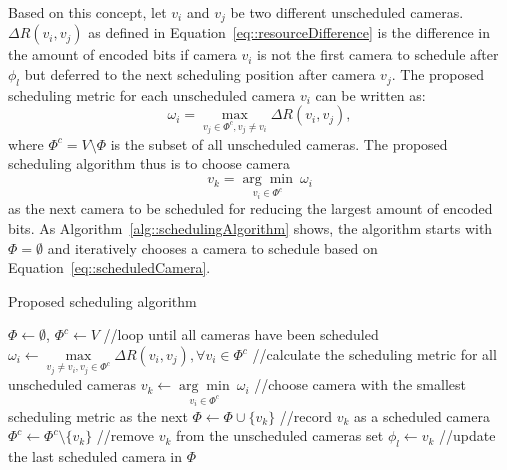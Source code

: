 Based on this concept, let $v_i$ and $v_j$ be two different unscheduled cameras.
$\Delta R(v_i,v_j)$ as defined in Equation~\eqref{eq::resourceDifference} is the
difference in the amount of encoded bits if camera $v_i$ is not the first camera
to schedule after $\phi_l$
but deferred to the next scheduling position after camera $v_j$.
%
The proposed scheduling metric for each unscheduled camera $v_i$ can be written as:
\begin{equation}
\omega_i = \max_{v_j \in \Phi^c, v_j \neq v_i} \Delta R(v_i,v_j),
\label{eq::schedulingMetric}
\end{equation}
%
where $\Phi^c = V \setminus \Phi$ is the subset of all unscheduled cameras.
%
The proposed scheduling algorithm thus is to choose camera
\begin{equation}
v_k = \underset{v_i \in \Phi^c}{\arg\min}~\omega_i
\label{eq::scheduledCamera}
\end{equation}
%
as the next camera to be scheduled 
for reducing the largest amount of encoded bits.
As  Algorithm~\ref{alg::schedulingAlgorithm} shows,
the algorithm starts with $\Phi = \emptyset$ and iteratively chooses a camera
to schedule based on Equation~\eqref{eq::scheduledCamera}.
%


\begin{algorithm}[t]
\caption{Proposed scheduling algorithm\label{alg::schedulingAlgorithm}}
\begin{algorithmic}[1]
\State $\Phi \gets \emptyset$, $\Phi^c \gets V$
 //loop until all cameras have been scheduled
\State $\omega_i \gets \underset{v_j \neq v_i, v_j \in \Phi^c}{\max} \Delta R(v_i,v_j),
\forall v_i \in \Phi^c$ //calculate the scheduling metric for all unscheduled
cameras
\State $v_k \gets \underset{v_i \in \Phi^c}{\arg\min}~\omega_i$ //choose camera
with the smallest scheduling metric as the next
\State $\Phi \gets \Phi \cup \{ v_k \}$ //record $v_k$ as a scheduled camera
\State $\Phi^c \gets \Phi^c \setminus \{ v_k \}$ //remove $v_k$ from the
unscheduled cameras set
\State $\phi_l \gets v_k$ //update the last scheduled camera in $\Phi$
\EndWhile
\end{algorithmic}
\end{algorithm} 
